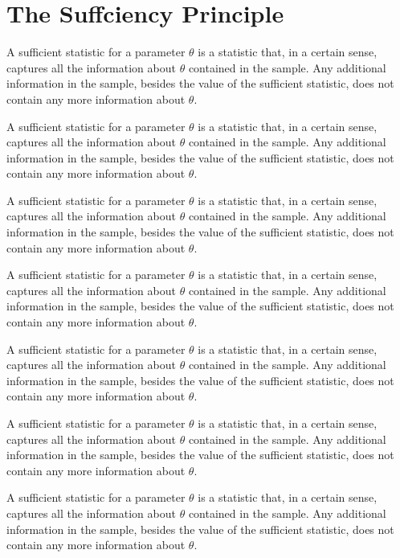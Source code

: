 \section{The Suffciency Principle}

A sufficient statistic for a parameter $\theta$ is a statistic that, in a certain sense, captures all the information about $\theta$ contained in the sample. Any additional information in the sample, besides the value of the sufficient statistic, does not contain any more information about $\theta$.

A sufficient statistic for a parameter $\theta$ is a statistic that, in a certain sense, captures all the information about $\theta$ contained in the sample. Any additional information in the sample, besides the value of the sufficient statistic, does not contain any more information about $\theta$.

A sufficient statistic for a parameter $\theta$ is a statistic that, in a certain sense, captures all the information about $\theta$ contained in the sample. Any additional information in the sample, besides the value of the sufficient statistic, does not contain any more information about $\theta$.

A sufficient statistic for a parameter $\theta$ is a statistic that, in a certain sense, captures all the information about $\theta$ contained in the sample. Any additional information in the sample, besides the value of the sufficient statistic, does not contain any more information about $\theta$.

A sufficient statistic for a parameter $\theta$ is a statistic that, in a certain sense, captures all the information about $\theta$ contained in the sample. Any additional information in the sample, besides the value of the sufficient statistic, does not contain any more information about $\theta$.

A sufficient statistic for a parameter $\theta$ is a statistic that, in a certain sense, captures all the information about $\theta$ contained in the sample. Any additional information in the sample, besides the value of the sufficient statistic, does not contain any more information about $\theta$.

A sufficient statistic for a parameter $\theta$ is a statistic that, in a certain sense, captures all the information about $\theta$ contained in the sample. Any additional information in the sample, besides the value of the sufficient statistic, does not contain any more information about $\theta$.

